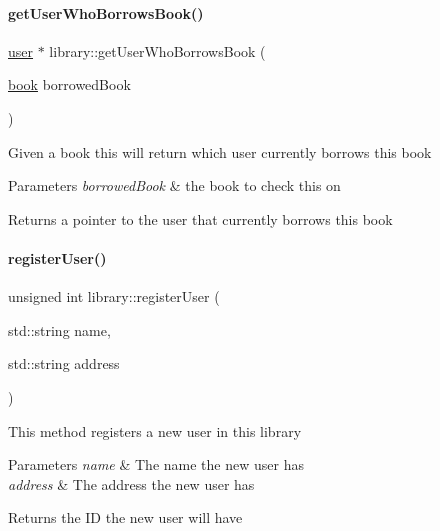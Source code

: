 \paragraph{\texorpdfstring{get\+User\+Who\+Borrows\+Book()}{getUserWhoBorrowsBook()}}
{\footnotesize\ttfamily \hyperlink{classuser}{user} $\ast$ library\+::get\+User\+Who\+Borrows\+Book (\begin{DoxyParamCaption}\item[{\hyperlink{classbook}{book}}]{borrowed\+Book }\end{DoxyParamCaption})}

Given a book this will return which user currently borrows this book


\begin{DoxyParams}{Parameters}
{\em borrowed\+Book} & the book to check this on \\
\hline
\end{DoxyParams}
\begin{DoxyReturn}{Returns}
a pointer to the user that currently borrows this book 
\end{DoxyReturn}
\mbox{\label{classlibrary_aa6ec346e2b49ee2a78b1c8f5ebbf7f79}} 
\paragraph{\texorpdfstring{register\+User()}{registerUser()}}
{\footnotesize\ttfamily unsigned int library\+::register\+User (\begin{DoxyParamCaption}\item[{std\+::string}]{name,  }\item[{std\+::string}]{address }\end{DoxyParamCaption})}

This method registers a new user in this library


\begin{DoxyParams}{Parameters}
{\em name} & The name the new user has \\
\hline
{\em address} & The address the new user has \\
\hline
\end{DoxyParams}
\begin{DoxyReturn}{Returns}
the ID the new user will have 
\end{DoxyReturn}
\mbox{\label{classlibrary_ac96feb544ebc882b53457ccbcf8f9196}} 
